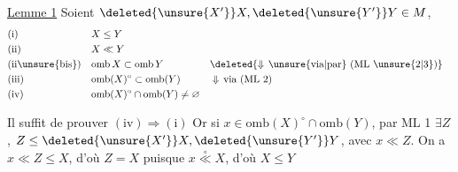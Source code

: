 


\uline{Lemme 1} Soient $\deleted{\unsure{X'}}X,\deleted{\unsure{Y'}}Y\in M$,   
\[
\begin{aligned}
&\text{(i)} && X\leq Y\\
&\text{(ii)} && X\ll Y\\
&\text{(ii\unsure{bis})} && \mathrm{omb}\,X\subset\mathrm{omb}\,Y
     && \deleted{\Downarrow\,\text{\unsure{via|par} (ML \unsure{2|3})}}\\
&\text{(iii)} && \mathrm{omb}(X)^\circ\subset\mathrm{omb}(Y)
     && \Downarrow\,\text{via (ML 2)}\\
&\text{(iv)} && \mathrm{omb}(X)^\circ\cap\mathrm{omb}(Y)\neq\varnothing
\end{aligned}
\]

Il suffit de prouver $(\mathrm{iv})\Longrightarrow(\mathrm{i})$ Or si $x\in\mathrm{omb}(X)^\circ\cap\mathrm{omb}(Y)$,  par ML 1 $\exists Z$, $Z\leq\deleted{\unsure{X'}}X,\deleted{\unsure{Y'}}Y$, avec $x\ll Z$\deleted{\unsure{$\ll$}}. On a $x\ll Z\leq X$, d'où $Z=X$ puisque $x\overset{\circ}{\ll}X$, d'où $X\leq Y$ 
